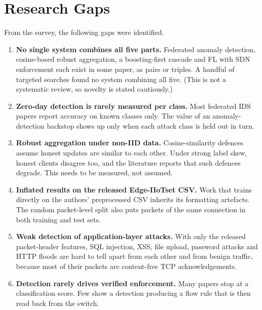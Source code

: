 \section{Research Gaps}
From the survey, the following gaps were identified.
\begin{enumerate}
  \item \textbf{No single system combines all five parts.} Federated anomaly detection, cosine-based robust aggregation, a boosting-first cascade and FL with SDN enforcement each exist in some paper, as pairs or triples. A handful of targeted searches found no system combining all five. (This is not a systematic review, so novelty is stated cautiously.)
  \item \textbf{Zero-day detection is rarely measured per class.} Most federated IDS papers report accuracy on known classes only. The value of an anomaly-detection backstop shows up only when each attack class is held out in turn.
  \item \textbf{Robust aggregation under non-IID data.} Cosine-similarity defences assume honest updates are similar to each other. Under strong label skew, honest clients disagree too, and the literature reports that such defences degrade. This needs to be measured, not assumed.
  \item \textbf{Inflated results on the released Edge-IIoTset CSV.} Work that trains directly on the authors' preprocessed CSV inherits its formatting artefacts. The random packet-level split also puts packets of the same connection in both training and test sets.
  \item \textbf{Weak detection of application-layer attacks.} With only the released packet-header features, SQL injection, XSS, file upload, password attacks and HTTP floods are hard to tell apart from each other and from benign traffic, because most of their packets are content-free TCP acknowledgements.
  \item \textbf{Detection rarely drives verified enforcement.} Many papers stop at a classification score. Few show a detection producing a flow rule that is then read back from the switch.
\end{enumerate}

